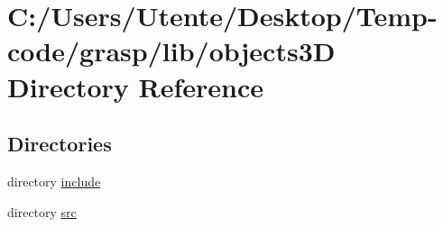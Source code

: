 \section{C\+:/\+Users/\+Utente/\+Desktop/\+Temp-\/code/grasp/lib/objects3\+D Directory Reference}
\label{dir_9dc847b3111d48001885bffbd4548fb3}
\subsection*{Directories}
\begin{DoxyCompactItemize}
\item 
directory \hyperlink{dir_2adc2e87b1e3c2226b4cb908843f1b50}{include}
\item 
directory \hyperlink{dir_58eafd9c5448b11a3dac027a0f0a8faf}{src}
\end{DoxyCompactItemize}
